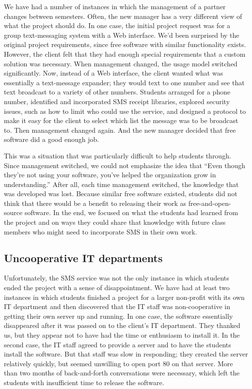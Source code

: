 We have had a number of instances in which the management of a
partner changes between semesters.  Often, the new manager has a
very different view of what the project should do.  In one case,
the initial project request was for a group text-messaging system
with a Web interface.  We'd been surprised by the original project
requirements, since free software with similar functionality exists.
However, the client felt that they had enough special requirements
that a custom solution was necessary.  When management changed, the
usage model switched significantly.  Now, instead of a Web interface,
the client wanted what was essentially a text-message expander;
they would text to one number and see that text broadcast to a
variety of other numbers.  Students arranged for a phone number,
identified and incorporated SMS receipt libraries, explored security
issues, such as how to limit who could use the service, and designed
a protocol to make it easy for the client to select which list the
message was to be broadcast to.  Then management changed again.  And
the new manager decided that free software did a good enough job.

This was a situation that was particularly difficult to help students
through.  Since management switched, we could not emphasize the idea
that ``Even though they're not using your software, you've helped the
organization grow in understanding.'' After all, each time management 
switched, the knowledge that was developed was lost.   Because similar
free software existed, students did not think that there would be
a benefit to releasing their work as free-and-open-source software.
In the end, we focused on what the students had learned from the project
and on ways they could share that knowledge with future class members
who might need to incorporate SMS in their own work.

\subsection{Uncooperative IT departments}

Unfortunately, the SMS service was not the only instance in which
students ended the project with a sense of disappointment.  We have
had at least two instances in which students finished a project for
a larger non-profit with its own IT department and then discovered that
the IT staff was non-cooperative in getting their own server up and
running.  In one case, the software essentially disappeared after
it was passed on to the client's IT department.  They thanked us,
but they appear not to have had the time or enthusiasm to install
it.  In the second case, the IT staff agreed to provide a server
and to have the students install the software.  But that staff was
slow in responding; they created the server relatively quickly, but
seemed unwilling to open port 80 on that server.  More than two
months of back-and-forth conversations were necessary, which left
the students with insufficient time to release the software.

